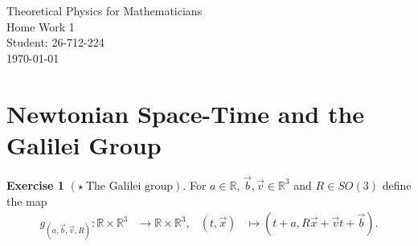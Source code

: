 \documentclass[12pt]{article}
\begin{document}
\begin{titlepage}
\centering
\vspace*{\fill} %

{\Huge Theoretical Physics for Mathematicians} \\[0.5cm] %
{\Huge Home Work 1}\\[1.5cm] %
{\Large Student: 26-712-224}\\[0.5cm] %
{\Large \today} %

\vspace*{\fill}
\end{titlepage}
\newpage
\noindent

\noindent

\section*{Newtonian Space-Time and the Galilei Group}

\noindent
\textbf{Exercise 1} $(\star\ \text{The Galilei group}).$
For $a \in \mathbb{R}$, $\vec{b},\vec{v} \in \mathbb{R}^3$ and
$R \in SO(3)$ define the map
\begin{align*}
g_{(a,\vec{b},\vec{v},R)}:
\mathbb{R} \times \mathbb{R}^3
&\longrightarrow
\mathbb{R} \times \mathbb{R}^3,
&
(t,\vec{x})
&\longmapsto
(t+a,R\vec{x}+\vec{v}t+\vec{b}).
\end{align*}
\end{document}
